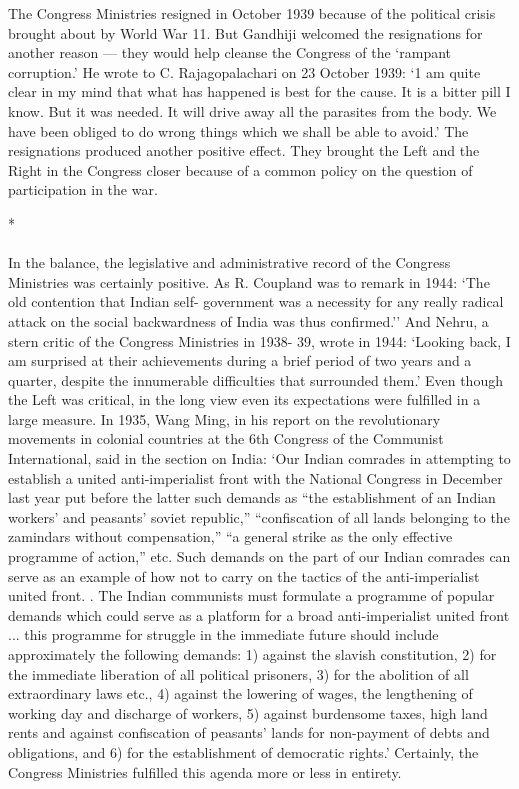 The Congress Ministries resigned in October 1939 because of the political crisis brought about by World War 11. But Gandhiji welcomed the resignations for another reason --- they would help cleanse the Congress of the `rampant corruption.' He wrote to C. Rajagopalachari on 23 October 1939: `1 am quite clear in my mind that what has happened is best for the cause. It is a bitter pill I know. But it was needed. It will drive away all the parasites from the body. We have been obliged to do wrong things which we shall be able to avoid.' The resignations produced another positive effect. They brought the Left and the Right in the Congress closer because of a common policy on the question of participation in the war.

\begin{center}*\end{center}

\paragraph*{}


In the balance, the legislative and administrative record of the Congress Ministries was certainly positive. As R. Coupland was to remark in 1944: `The old contention that Indian self- government was a necessity for any really radical attack on the social backwardness of India was thus confirmed.'' And Nehru, a stern critic of the Congress Ministries in 1938- 39, wrote in 1944: `Looking back, I am surprised at their achievements during a brief period of two years and a quarter, despite the innumerable difficulties that surrounded them.' Even though the Left was critical, in the long view even its expectations were fulfilled in a large measure. In 1935, Wang Ming, in his report on the revolutionary movements in colonial countries at the 6th Congress of the Communist International, said in the section on India: `Our Indian comrades in attempting to establish a united anti-imperialist front with the National Congress in December last year put before the latter such demands as ``the establishment of an Indian workers' and peasants' soviet republic,'' ``confiscation of all lands belonging to the zamindars without compensation,'' ``a general strike as the only effective programme of action,'' etc. Such demands on the part of our Indian comrades can serve as an example of how not to carry on the tactics of the anti-imperialist united front. . The Indian communists must formulate a programme of popular demands which could serve as a platform for a broad anti-imperialist united front ... this programme for struggle in the immediate future should include approximately the following demands: 1) against the slavish constitution, 2) for the immediate liberation of all political prisoners, 3) for the abolition of all extraordinary laws etc., 4) against the lowering of wages, the lengthening of working day and discharge of workers, 5) against burdensome taxes, high land rents and against confiscation of peasants' lands for non-payment of debts and obligations, and 6) for the establishment of democratic rights.' Certainly, the Congress Ministries fulfilled this agenda more or less in entirety. 

